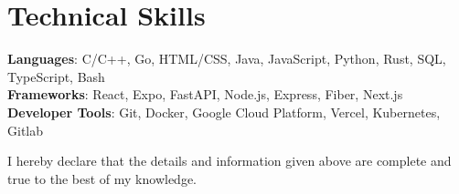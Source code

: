 \documentclass[letterpaper,11pt]{article}
\begin{document}
\section{Technical Skills}
 \begin{itemize}[leftmargin=0.15in, label={}]
  \small{\item{
   \textbf{Languages}{: C/C++, Go, HTML/CSS, Java, JavaScript, Python, Rust, SQL, TypeScript, Bash} \\
   \textbf{Frameworks}{: React, Expo, FastAPI, Node.js, Express, Fiber, Next.js} \\
   \textbf{Developer Tools}{: Git, Docker, Google Cloud Platform, Vercel, Kubernetes, Gitlab} \\
  }}
 \end{itemize}

\vspace{2em}
\begin{center}
    \small I hereby declare that the details and information given above are complete and true to the best of my knowledge.
\end{center}
\end{document}
